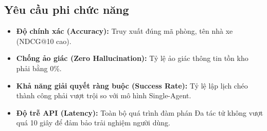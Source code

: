 \subsection{Yêu cầu phi chức năng}
\begin{itemize}
    \item \textbf{Độ chính xác (Accuracy):} Truy xuất đúng mã phòng, tên nhà xe (NDCG@10 cao). 
    \item \textbf{Chống ảo giác (Zero Hallucination):} Tỷ lệ ảo giác thông tin tồn kho phải bằng 0\%.
    \item \textbf{Khả năng giải quyết ràng buộc (Success Rate):} Tỷ lệ lập lịch chéo thành công phải vượt trội so với mô hình Single-Agent.
    \item \textbf{Độ trễ API (Latency):} Toàn bộ quá trình đàm phán Đa tác tử không vượt quá 10 giây để đảm bảo trải nghiệm người dùng.
\end{itemize}
